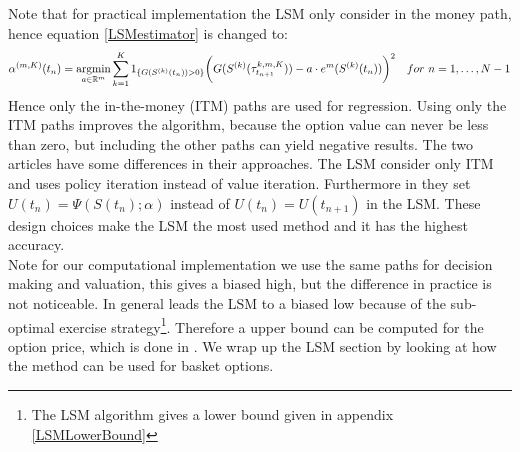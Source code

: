 Note that for practical implementation the LSM only consider in the money path, hence equation \eqref{LSMestimator} is changed to:
\begin{equation*}
\alpha^{(m,K)}(t_n)= \operatorname*{argmin}_{a\in \mathbb{R}^m} \sum_{k=1}^{K} 1_{\{G(S^{(k)}(t_n))>0\}} \bigg(G(S^{(k)}(\tau^{k,m,K}_{t_{n+1}}))  -a \cdot e^m(S^{(k)}(t_{n})) \bigg)^2 \quad for \ n=1, \ldots, N-1
\end{equation*}
Hence only the in-the-money (ITM) paths are used for regression. Using only the ITM paths improves the algorithm, because the option value can never be less than zero, but including the other paths can yield negative results. The two articles \parencite{LSM, Tsitsiklis} have some differences in their approaches. The LSM consider only ITM and uses policy iteration instead of value iteration. Furthermore in \parencite{Tsitsiklis} they set $U(t_n)= \Psi(S(t_n); \alpha)$ instead of $U(t_n)= U(t_{n+1})$ in the LSM. These design choices make the LSM the most used method and it has the highest accuracy.\\

Note for our computational implementation we use the same paths for decision making and valuation, this gives a biased high, but the difference in practice is not noticeable. In general leads the LSM to a biased low because of the sub-optimal exercise strategy\footnote{The LSM algorithm gives a lower bound given in appendix \ref{LSMLowerBound}}. Therefore a upper bound can be computed for the option price, which is done in \parencite{AndersenLeif2004}. We wrap up the LSM section by looking at how the method can be used for basket options.

